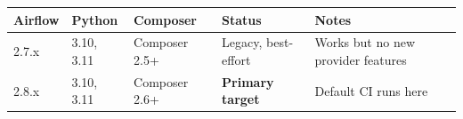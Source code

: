 \documentclass[
  11pt,
  british,
  oneside]{book}
\begin{document}
\begin{longtable}[]{@{}lllll@{}}
\toprule
\begin{minipage}[b]{0.17\columnwidth}\raggedright
Airflow\strut
\end{minipage} & \begin{minipage}[b]{0.17\columnwidth}\raggedright
Python\strut
\end{minipage} & \begin{minipage}[b]{0.17\columnwidth}\raggedright
Composer\strut
\end{minipage} & \begin{minipage}[b]{0.17\columnwidth}\raggedright
Status\strut
\end{minipage} & \begin{minipage}[b]{0.17\columnwidth}\raggedright
Notes\strut
\end{minipage}\tabularnewline
\midrule
\endhead
\begin{minipage}[t]{0.17\columnwidth}\raggedright
2.7.x\strut
\end{minipage} & \begin{minipage}[t]{0.17\columnwidth}\raggedright
3.10, 3.11\strut
\end{minipage} & \begin{minipage}[t]{0.17\columnwidth}\raggedright
Composer 2.5+\strut
\end{minipage} & \begin{minipage}[t]{0.17\columnwidth}\raggedright
Legacy, best-effort\strut
\end{minipage} & \begin{minipage}[t]{0.17\columnwidth}\raggedright
Works but no new provider features\strut
\end{minipage}\tabularnewline
\begin{minipage}[t]{0.17\columnwidth}\raggedright
2.8.x\strut
\end{minipage} & \begin{minipage}[t]{0.17\columnwidth}\raggedright
3.10, 3.11\strut
\end{minipage} & \begin{minipage}[t]{0.17\columnwidth}\raggedright
Composer 2.6+\strut
\end{minipage} & \begin{minipage}[t]{0.17\columnwidth}\raggedright
\textbf{Primary target}\strut
\end{minipage} & \begin{minipage}[t]{0.17\columnwidth}\raggedright
Default CI runs here\strut
\end{minipage}\tabularnewline

\end{longtable}
\end{document}
